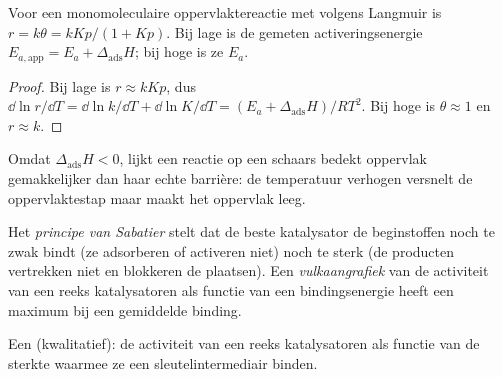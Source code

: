 \begin{proposition}\label{prop:b3:surfaces-catalysis:apparent-ea}
Voor een monomoleculaire oppervlaktereactie met  volgens Langmuir
is $r = k\theta = kKp/(1 + Kp)$.
Bij lage  is de gemeten activeringsenergie $E_{a,\mathrm{app}} = E_a + \Delta_{\mathrm{ads}}H$; bij
hoge  is ze $E_a$.
\end{proposition}

\begin{proof}
Bij lage  is $r \approx kKp$, dus $\dd\ln r/\dd T = \dd\ln k/\dd T + \dd\ln K/\dd T = (E_a + \Delta_{\mathrm{ads}}H)/RT^2$.
Bij hoge  is $\theta \approx 1$ en $r \approx k$.
\end{proof}

Omdat $\Delta_{\mathrm{ads}}H < 0$, lijkt een reactie op een schaars bedekt
oppervlak gemakkelijker dan haar echte barrière: de temperatuur verhogen
versnelt de oppervlaktestap maar maakt het oppervlak leeg.

\begin{definition}\label{def:b3:surfaces-catalysis:sabatier}
Het \emph{principe van Sabatier} stelt dat de
beste katalysator de beginstoffen noch te zwak bindt (ze adsorberen of
activeren niet) noch te sterk (de producten vertrekken niet en blokkeren
de plaatsen). Een
\emph{vulkaangrafiek} van de activiteit van een reeks
katalysatoren als functie van een bindingsenergie heeft een maximum bij
een gemiddelde binding.
\end{definition}

\begin{omfigure}

{\small Een  (kwalitatief): de activiteit van een reeks
katalysatoren als functie van de sterkte waarmee ze een sleutelintermediair
binden.}
\end{omfigure}

